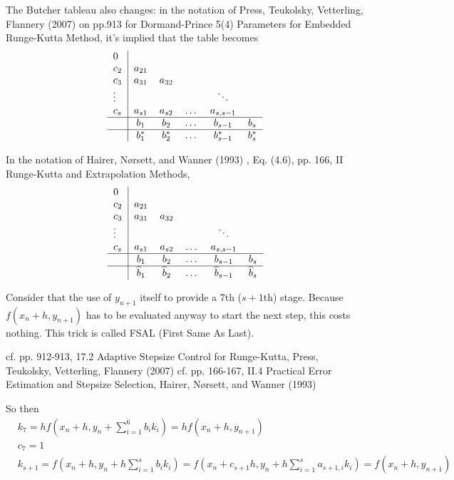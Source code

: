 \documentclass[10pt]{amsart}
\begin{document}
\begin{multicols*}{2}
The Butcher tableau also changes: in the notation of  Press, Teukolsky, Vetterling, Flannery (2007) \cite{PTVF2007} on pp.913 for Dormand-Prince 5(4) Parameters for Embedded Runge-Kutta Method, it's implied that the table becomes
\[
	\begin{tabular}{ l|c c c c c }
		0 & & & & & \\
		$c_2$ & $a_{21}$ &  & & & \\ 
		$c_3$ & $a_{31}$ & $a_{32}$ & & & \\ 
		$\vdots$ &  & & & $\ddots$ & \\ 
		$c_s$ & $a_{s1}$ & $a_{s2}$ & \dots & $a_{s, s-1}$ & \\
		\hline 
		& $b_1$ & $b_2$ & \dots & $b_{s-1}$ & $b_s$ \\	
		\hline 
		& $b^*_1$ & $b^*_2$ & \dots & $b^*_{s-1}$ & $b^*_s$ \\	
	\end{tabular}
\]

In the notation of Hairer, N\o rsett, and Wanner (1993) \cite{HNW1993}, Eq. (4.6), pp. 166, II Runge-Kutta and Extrapolation Methods,
\begin{equation}
	\begin{tabular}{ l|c c c c c }
		0 & & & & & \\
		$c_2$ & $a_{21}$ &  & & & \\ 
		$c_3$ & $a_{31}$ & $a_{32}$ & & & \\ 
		$\vdots$ &  & & & $\ddots$ & \\ 
		$c_s$ & $a_{s1}$ & $a_{s2}$ & \dots & $a_{s, s-1}$ & \\
		\hline 
		& $b_1$ & $b_2$ & \dots & $b_{s-1}$ & $b_s$ \\	
		\hline
		& $\widehat{b}_1$ & $\widehat{b}_2$ & \dots & $\widehat{b}_{s-1}$ & $\widehat{b}_s$ \\
	\end{tabular}
\end{equation}


Consider that the use of $y_{n+1}$ itself to provide a 7th ($s+1$th) stage. Because $f(x_n+h , y_{n+1})$ has to be evaluated anyway to start the next step, this costs nothing. This trick is called FSAL (First Same As Last).

cf. pp. 912-913, 17.2 Adaptive Stepsize Control for Runge-Kutta, Press, Teukolsky, Vetterling, Flannery (2007) \cite{PTVF2007}
cf. pp. 166-167, II.4 Practical Error Estimation and Stepsize Selection, Hairer, N\o rsett, and Wanner (1993) \cite{HNW1993}

So then
\[
\begin{aligned}
	& k_7 = h f(x_n + h, y_n + \sum_{i=1}^6 b_i k_i) = hf(x_n + h,y_{n+1}) \\
	& c_7 = 1 \\
	& k_{s+1} = f(x_n +h , y_n + h\sum_{i=1}^s b_i k_i) = f(x_n + c_{s+1}h , y_n + h\sum_{i=1}^s a_{s+1,i} k_i) = f(x_n + h,y_{n+1})
\end{aligned}
\]


\end{multicols*}
\end{document}
